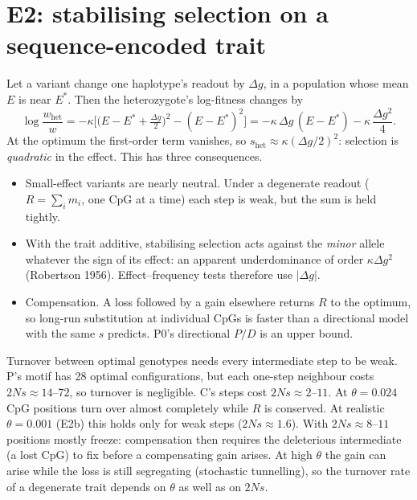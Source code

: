 \documentclass[11pt]{article}
\theoremstyle{definition}
\begin{document}
\section{E2: stabilising selection on a sequence-encoded trait}\label{sec:e2}
Let a variant change one haplotype's readout by $\Delta g$, in a population whose mean $E$ is near $E^*$. Then the
heterozygote's log-fitness changes by
\begin{equation}
\log\frac{w_{\text{het}}}{w}=-\kappa\Big[\big(E-E^*+\tfrac{\Delta g}{2}\big)^2-(E-E^*)^2\Big]
=-\kappa\,\Delta g\,(E-E^*)-\kappa\,\frac{\Delta g^2}{4}.
\end{equation}
At the optimum the first-order term vanishes, so $s_{\text{het}}\approx\kappa(\Delta g/2)^2$: selection is
\emph{quadratic} in the effect. This has three consequences.
\begin{itemize}
\item Small-effect variants are nearly neutral. Under a degenerate readout ($R=\sum_i m_i$, one CpG at a time) each
  step is weak, but the sum is held tightly.
\item With the trait additive, stabilising selection acts against the \emph{minor} allele whatever the sign of its
  effect: an apparent underdominance of order $\kappa\Delta g^2$ (Robertson 1956). Effect--frequency tests therefore
  use $|\Delta g|$.
\item Compensation. A loss followed by a gain elsewhere returns $R$ to the optimum, so long-run substitution at
  individual CpGs is faster than a directional model with the same $s$ predicts. P0's directional $P/D$ is an upper
  bound.
\end{itemize}
Turnover between optimal genotypes needs every intermediate step to be weak. P's motif has 28 optimal
configurations, but each one-step neighbour costs $2Ns\approx14$--$72$, so turnover is negligible. C's steps cost
$2Ns\approx2$--$11$. At $\theta=0.024$ CpG positions turn over almost completely while $R$ is conserved.
At realistic $\theta=0.001$ (E2b) this holds only for weak steps ($2Ns\approx1.6$). With $2Ns\approx8$--$11$
positions mostly freeze: compensation then requires the deleterious intermediate (a lost CpG) to fix before a
compensating gain arises. At high $\theta$ the gain can arise while the loss is still segregating (stochastic
tunnelling), so the turnover rate of a degenerate trait depends on $\theta$ as well as on $2Ns$.
\end{document}
